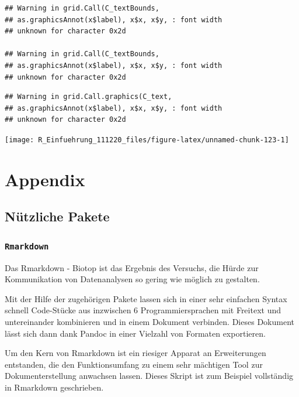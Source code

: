 \documentclass[
]{book}
\begin{document}
\begin{verbatim}
## Warning in grid.Call(C_textBounds,
## as.graphicsAnnot(x$label), x$x, x$y, : font width
## unknown for character 0x2d

## Warning in grid.Call(C_textBounds,
## as.graphicsAnnot(x$label), x$x, x$y, : font width
## unknown for character 0x2d
\end{verbatim}

\begin{verbatim}
## Warning in grid.Call.graphics(C_text,
## as.graphicsAnnot(x$label), x$x, x$y, : font width
## unknown for character 0x2d
\end{verbatim}

\begin{center}\texttt{[image: R\_Einfuehrung\_111220\_files/figure-latex/unnamed-chunk-123-1]} \end{center}

\hypertarget{appendix}{%
\chapter{Appendix}\label{appendix}}

\hypertarget{nuxfctzliche-pakete}{%
\section{Nützliche Pakete}\label{nuxfctzliche-pakete}}

\hypertarget{rmarkdown}{%
\subsection{\texorpdfstring{\texttt{Rmarkdown}}{Rmarkdown}}\label{rmarkdown}}

Das Rmarkdown - Biotop ist das Ergebnis des Versuchs, die Hürde zur Kommunikation von Datenanalysen so gering wie möglich zu gestalten.

Mit der Hilfe der zugehörigen Pakete lassen sich in einer sehr einfachen Syntax schnell Code-Stücke aus inzwischen 6 Programmiersprachen mit Freitext und untereinander kombinieren und in einem Dokument verbinden. Dieses Dokument lässt sich dann dank Pandoc in einer Vielzahl von Formaten exportieren.

Um den Kern von Rmarkdown ist ein riesiger Apparat an Erweiterungen entstanden, die den Funktionsumfang zu einem sehr mächtigen Tool zur Dokumenterstellung anwachsen lassen. Dieses Skript ist zum Beispiel vollständig in Rmarkdown geschrieben.
\end{document}
